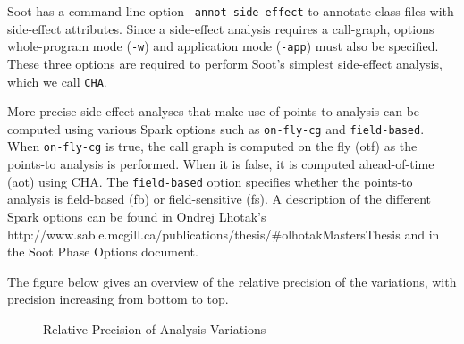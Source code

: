 \documentclass{article}
\begin{document}
Soot has a command-line option {\tt-annot-side-effect} 
to annotate class files with side-effect attributes. Since
a side-effect analysis requires a call-graph, options
whole-program mode ({\tt -w}) and application mode ({\tt -app}) must
also be specified. These three options are
required to perform Soot's simplest side-effect analysis, which we
call {\tt CHA}.

More precise side-effect analyses that make use of points-to
analysis can be computed using
various Spark options such as {\tt on-fly-cg} and {\tt field-based}.
When {\tt on-fly-cg} is true, the call graph is computed 
on the fly (otf) as the points-to analysis is performed. When it is false, it is
computed ahead-of-time (aot) using CHA. The {\tt field-based} option
specifies whether the points-to analysis is field-based (fb) or
field-sensitive (fs). A description of the different Spark
options can be found in Ondrej Lhotak's 
{http://www.sable.mcgill.ca/publications/thesis/\#olhotakMastersThesis}
and in the Soot
Phase Options document. 

The figure below gives an overview of the relative precision of the 
variations, with precision increasing from bottom to top.

\begin{figure}[htb]
  \begin{center}
  \end{center}

\caption{Relative Precision of Analysis Variations\label{FIG:LATTICE}}
\end{figure}
\end{document}
